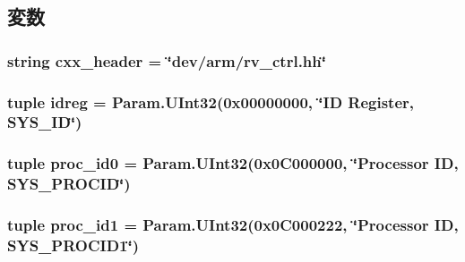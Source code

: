 \subsection{変数}
\hypertarget{classRealView_1_1RealViewCtrl_a17da7064bc5c518791f0c891eff05fda}{
\subsubsection[{cxx\_\-header}]{\setlength{\rightskip}{0pt plus 5cm}string {\bf cxx\_\-header} = \char`\"{}dev/arm/rv\_\-ctrl.hh\char`\"{}}}
\label{classRealView_1_1RealViewCtrl_a17da7064bc5c518791f0c891eff05fda}
\hypertarget{classRealView_1_1RealViewCtrl_aacf690a53ecbec448c90e3974c61e27c}{
\subsubsection[{idreg}]{\setlength{\rightskip}{0pt plus 5cm}tuple {\bf idreg} = Param.UInt32(0x00000000, \char`\"{}ID Register, SYS\_\-ID\char`\"{})}}
\label{classRealView_1_1RealViewCtrl_aacf690a53ecbec448c90e3974c61e27c}
\hypertarget{classRealView_1_1RealViewCtrl_a0408463a4e55d022875f21688adb407f}{
\subsubsection[{proc\_\-id0}]{\setlength{\rightskip}{0pt plus 5cm}tuple {\bf proc\_\-id0} = Param.UInt32(0x0C000000, \char`\"{}Processor ID, SYS\_\-PROCID\char`\"{})}}
\label{classRealView_1_1RealViewCtrl_a0408463a4e55d022875f21688adb407f}
\hypertarget{classRealView_1_1RealViewCtrl_a10f3e2dba94dee9578902a924571bdb5}{
\subsubsection[{proc\_\-id1}]{\setlength{\rightskip}{0pt plus 5cm}tuple {\bf proc\_\-id1} = Param.UInt32(0x0C000222, \char`\"{}Processor ID, SYS\_\-PROCID1\char`\"{})}}
